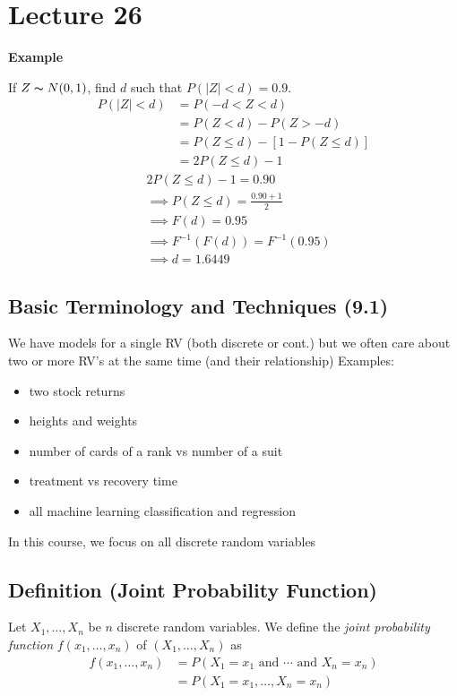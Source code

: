 \section{Lecture 26}
\textbf{Example}

If $ Z \thicksim N(0,1) $, find $ d $ such that $ P(|Z|<d)=0.9 $.
\begin{align*}
    P(|Z|<d)&=P(-d<Z<d)\\
    &=P(Z<d)-P(Z>-d)\\
    &=P(Z\le d)-\left[ 1-P(Z\le d) \right]\\
    &=2P(Z\le d)-1
\end{align*}
\begin{align*}
    &2P(Z\le d)-1=0.90\\
    &\implies P(Z\le d)=\frac{0.90+1}{2}\\
    &\implies F(d)=0.95\\
    &\implies F^{-1}(F(d))=F^{-1}(0.95)\\
    &\implies d=1.6449
\end{align*}

\subsection{Basic Terminology and Techniques (9.1)}
We have models for a single RV (both discrete or cont.) but we often
care about two or more RV's at the same time (and their relationship)
Examples:
\begin{itemize}
    \item two stock returns
    \item heights and weights
    \item number of cards of a rank vs number of a suit
    \item treatment vs recovery time
    \item all machine learning classification and regression
\end{itemize}
In this course, we focus on all discrete random variables

\begin{defbox}
    \subsection{Definition (Joint Probability Function)}
    Let $ X_1,\ldots,X_n $ be $ n $ discrete random variables.
    We define the \emph{joint probability function} $ f(x_1,\ldots,x_n) $ of
    $ (X_1,\ldots,X_n) $ as
    \begin{align*}
        f(x_1,\ldots,x_n)&=P(X_1=x_1 \text{ and } \cdots \text{ and } X_n=x_n)\\
        &=P(X_1=x_1,\ldots,X_n=x_n)
    \end{align*}
\end{defbox}

